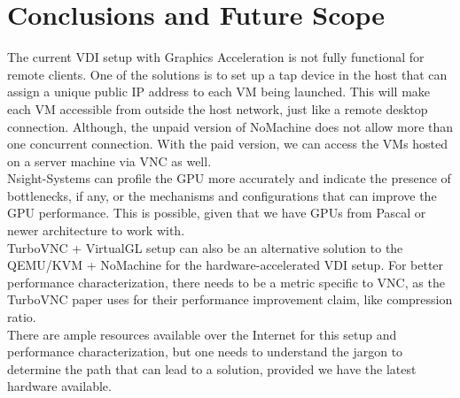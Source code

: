 \documentclass[a4paper,12pt, final]{report}
\begin{document}
\chapter{Conclusions and Future Scope}

The current VDI setup with Graphics Acceleration is not fully functional for remote clients. One of the solutions is to set up a tap device in the host that can assign a unique public IP address to each VM being launched. This will make each VM accessible from outside the host network, just like a remote desktop connection. Although, the unpaid version of NoMachine does not allow more than one concurrent connection. With the paid version, we can access the VMs hosted on a server machine via VNC as well.\\

\noindent Nsight-Systems can profile the GPU more accurately and indicate the presence of bottlenecks, if any, or the mechanisms and configurations that can improve the GPU performance. This is possible, given that we have GPUs from Pascal or newer architecture to work with.\\

\noindent TurboVNC + VirtualGL setup can also be an alternative solution to the QEMU/KVM + NoMachine for the hardware-accelerated VDI setup. For better performance characterization, there needs to be a metric specific to VNC, as the TurboVNC paper \cite{turbovnc_report} uses for their performance improvement claim, like compression ratio.\\

\noindent There are ample resources available over the Internet for this setup and performance characterization, but one needs to understand the jargon to determine the path that can lead to a solution, provided we have the latest hardware available.

% 
% 
% 
\printbibliography
\end{document}
